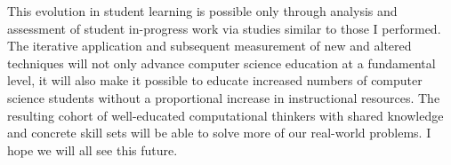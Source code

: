 This evolution in student learning is possible only through analysis and
assessment of student in-progress work via studies similar to those I
performed. The iterative application and subsequent measurement of new and
altered techniques will not only advance computer science education at a
fundamental level, it will also make it possible to educate increased numbers
of computer science students without a proportional increase in instructional
resources. The resulting cohort of well-educated computational thinkers with
shared knowledge and concrete skill sets will be able to solve more of our
real-world problems. I hope we will all see this future.
